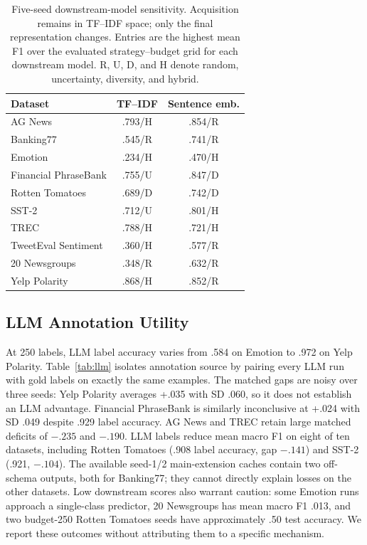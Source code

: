 \documentclass[conference]{IEEEtran}
\begin{document}
\begin{table}[t]
\caption{Five-seed downstream-model sensitivity. Acquisition remains in TF--IDF space; only the final representation changes. Entries are the highest mean F1 over the evaluated strategy--budget grid for each downstream model. R, U, D, and H denote random, uncertainty, diversity, and hybrid.}
\label{tab:robustness}
\centering
\footnotesize
\begin{tabular}{lcc}
\toprule
Dataset & TF--IDF & Sentence emb. \\
\midrule
AG News & .793/H & .854/R \\
Banking77 & .545/R & .741/R \\
Emotion & .234/H & .470/H \\
Financial PhraseBank & .755/U & .847/D \\
Rotten Tomatoes & .689/D & .742/D \\
SST-2 & .712/U & .801/H \\
TREC & .788/H & .721/H \\
TweetEval Sentiment & .360/H & .577/R \\
20 Newsgroups & .348/R & .632/R \\
Yelp Polarity & .868/H & .852/R \\
\bottomrule
\end{tabular}
\end{table}

\subsection{LLM Annotation Utility}
At 250 labels, LLM label accuracy varies from .584 on Emotion to .972 on Yelp Polarity. Table~\ref{tab:llm} isolates annotation source by pairing every LLM run with gold labels on exactly the same examples. The matched gaps are noisy over three seeds: Yelp Polarity averages +.035 with SD .060, so it does not establish an LLM advantage. Financial PhraseBank is similarly inconclusive at +.024 with SD .049 despite .929 label accuracy. AG News and TREC retain large matched deficits of $-.235$ and $-.190$. LLM labels reduce mean macro F1 on eight of ten datasets, including Rotten Tomatoes (.908 label accuracy, gap $-.141$) and SST-2 (.921, $-.104$). The available seed-1/2 main-extension caches contain two off-schema outputs, both for Banking77; they cannot directly explain losses on the other datasets. Low downstream scores also warrant caution: some Emotion runs approach a single-class predictor, 20 Newsgroups has mean macro F1 .013, and two budget-250 Rotten Tomatoes seeds have approximately .50 test accuracy. We report these outcomes without attributing them to a specific mechanism.
\end{document}
